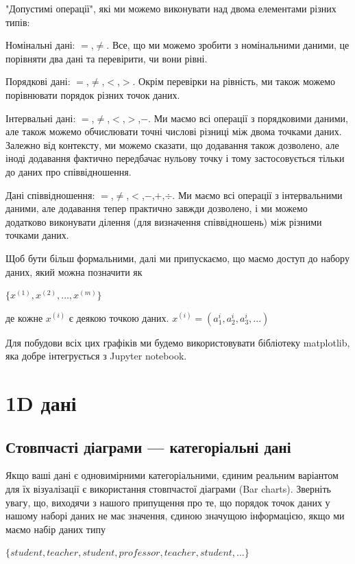  "Допустимі операції", які ми можемо виконувати над двома елементами різних типів:

Номінальні дані: $=$,$\neq$. Все, що ми можемо зробити з номінальними даними, це порівняти два дані та перевірити, чи вони рівні.

Порядкові дані: $=$,$\neq$,$<$,$>$. Окрім перевірки на рівність, ми також можемо порівнювати порядок різних точок даних.

Інтервальні дані: $=$,$\neq$,$<$,$>$,$-$. Ми маємо всі операції з порядковими даними, але також можемо обчислювати точні числові різниці між двома точками даних. Залежно від контексту, ми можемо сказати, що додавання також дозволено, але іноді додавання фактично передбачає нульову точку і тому застосовується тільки до даних про співвідношення.

Дані співвідношення: $=$,$\neq$,$<$,$-$,$+$,$\div$. Ми маємо всі операції з інтервальними даними, але додавання тепер практично завжди дозволено, і ми можемо додатково виконувати ділення (для визначення співвідношень) між різними точками даних.

Щоб бути більш формальними, далі ми припускаємо, що маємо доступ до набору даних, який можна позначити як

$\{x^{(1)},x^{(2)},\dots,x^{(m)}\}$

де кожне $x^{(i)}$ є деякою точкою даних. $x^{(i)}=(a_{1}^{i}, a_{2}^{i}, a_{3}^{i}, ...)$

Для побудови всіх цих графіків ми будемо використовувати бібліотеку matplotlib, яка добре інтегрується з Jupyter notebook.



\section{1D дані}

\subsection{Стовпчасті діаграми — категоріальні дані}

Якщо ваші дані є одновимірними категоріальними, єдиним реальним варіантом для їх візуалізації є використання стовпчастої діаграми (Bar charts). Зверніть увагу, що, виходячи з нашого припущення про те, що порядок точок даних у нашому наборі даних не має значення, єдиною значущою інформацією, якщо ми маємо набір даних типу

$\{student,teacher,student,professor,teacher,student,\dots\}$

